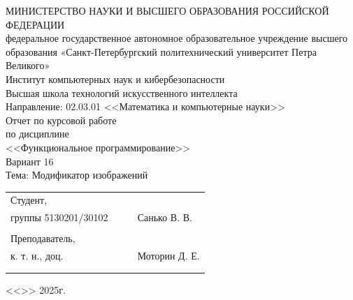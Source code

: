 \documentclass[a4paper, final]{article}
\begin{document}
	
	\begin{center}
		\hfill \break
		\hfill \break
		\normalsize{МИНИСТЕРСТВО НАУКИ И ВЫСШЕГО ОБРАЗОВАНИЯ РОССИЙСКОЙ ФЕДЕРАЦИИ\\
			федеральное государственное автономное образовательное учреждение высшего образования «Санкт-Петербургский политехнический университет Петра Великого»\\[10pt]}
		\normalsize{Институт компьютерных наук и кибербезопасности}\\[10pt] 
		\normalsize{Высшая школа технологий искусственного интеллекта}\\[10pt] 
		\normalsize{Направление: 02.03.01 <<Математика и компьютерные науки>>}\\
		
		\hfill \break
		\hfill \break
		\hfill \break
		\hfill \break
		\large{Отчет по курсовой работе}\\
		\large{по дисциплине}\\
		\large{<<Функциональное программирование>>}\\
		\large{Вариант 16}\\
		\large{Тема: Модификатор изображений}\\
		\hfill \break
		
	\end{center}
	
	\small{ 
		\begin{tabular}{lrrl}
			\!\!\!Студент, & \hspace{2cm} & & \\
			\!\!\!группы 5130201/30102 & \hspace{2cm} & \underline{\hspace{3cm}} & Санько В. В. \\\\
			\!\!\!Преподаватель,\\ \hspace{-5pt}к. т. н., доц. & \hspace{2cm} &  \underline{\hspace{3cm}} &  Моторин Д. Е. \\\\
			&&\hspace{4cm}
		\end{tabular}
		\begin{flushright}
			<<\underline{\hspace{1cm}}>>\underline{\hspace{2.5cm}} 2025г.
		\end{flushright}
	}
	
\end{document}
